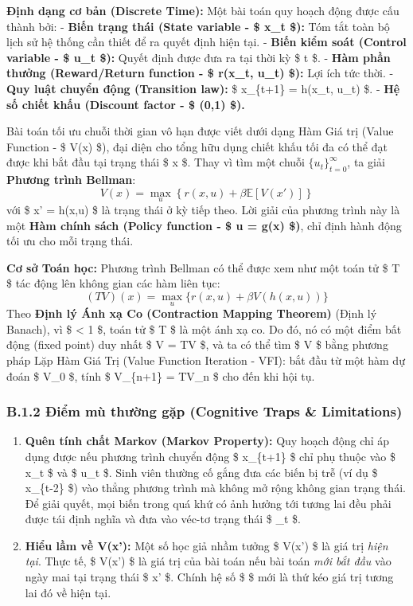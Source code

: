 \documentclass[
]{article}
\providecommand{\tightlist}{%
  \setlength{\itemsep}{0pt}\setlength{\parskip}{0pt}}
\begin{document}
\textbf{Định dạng cơ bản (Discrete Time):} Một bài toán quy hoạch động
được cấu thành bởi: - \textbf{Biến trạng thái (State variable - \$ x\_t
\$):} Tóm tắt toàn bộ lịch sử hệ thống cần thiết để ra quyết định hiện
tại. - \textbf{Biến kiểm soát (Control variable - \$ u\_t \$):} Quyết
định được đưa ra tại thời kỳ \$ t \$. - \textbf{Hàm phần thưởng
(Reward/Return function - \$ r(x\_t, u\_t) \$):} Lợi ích tức thời. -
\textbf{Quy luật chuyển động (Transition law):} \$ x\_\{t+1\} = h(x\_t,
u\_t) \$. - \textbf{Hệ số chiết khấu (Discount factor - \$
\beta \in (0,1) \$).}

Bài toán tối ưu chuỗi thời gian vô hạn được viết dưới dạng Hàm Giá trị
(Value Function - \$ V(x) \$), đại diện cho tổng hữu dụng chiết khấu tối
đa có thể đạt được khi bắt đầu tại trạng thái \$ x \$. Thay vì tìm một
chuỗi \(\{u_t\}_{t=0}^\infty\), ta giải \textbf{Phương trình Bellman}:
\[ V(x) = \max_{u} \left\{ r(x,u) + \beta \mathbb{E}[V(x')] \right\} \]
với \$ x' = h(x,u) \$ là trạng thái ở kỳ tiếp theo. Lời giải của phương
trình này là một \textbf{Hàm chính sách (Policy function - \$ u = g(x)
\$)}, chỉ định hành động tối ưu cho mỗi trạng thái.

\textbf{Cơ sở Toán học:} Phương trình Bellman có thể được xem như một
toán tử \$ T \$ tác động lên không gian các hàm liên tục:
\[ (TV)(x) = \max_u \{ r(x,u) + \beta V(h(x,u)) \} \] Theo \textbf{Định
lý Ánh xạ Co (Contraction Mapping Theorem)} (Định lý Banach), vì \$
\beta \textless{} 1 \$, toán tử \$ T \$ là một ánh xạ co. Do đó, nó có
một điểm bất động (fixed point) duy nhất \$ V = TV \$, và ta có thể tìm
\$ V \$ bằng phương pháp Lặp Hàm Giá Trị (Value Function Iteration -
VFI): bắt đầu từ một hàm dự đoán \$ V\_0 \$, tính \$ V\_\{n+1\} = TV\_n
\$ cho đến khi hội tụ.

\subsubsection{B.1.2 Điểm mù thường gặp (Cognitive Traps \&
Limitations)}\label{b.1.2-ux111iux1ec3m-muxf9-thux1b0ux1eddng-gux1eb7p-cognitive-traps-limitations}

\begin{enumerate}
\def\labelenumi{\arabic{enumi}.}
\tightlist
\item
  \textbf{Quên tính chất Markov (Markov Property):} Quy hoạch động chỉ
  áp dụng được nếu phương trình chuyển động \$ x\_\{t+1\} \$ chỉ phụ
  thuộc vào \$ x\_t \$ và \$ u\_t \$. Sinh viên thường cố gắng đưa các
  biến bị trễ (ví dụ \$ x\_\{t-2\} \$) vào thẳng phương trình mà không
  mở rộng không gian trạng thái. Để giải quyết, mọi biến trong quá khứ
  có ảnh hưởng tới tương lai đều phải được tái định nghĩa và đưa vào
  véc-tơ trạng thái \$ \_t \$.
\item
  \textbf{Hiểu lầm về V(x'):} Một số học giả nhầm tưởng \$ V(x') \$ là
  giá trị \emph{hiện tại}. Thực tế, \$ V(x') \$ là giá trị của bài toán
  nếu bài toán \emph{mới bắt đầu} vào ngày mai tại trạng thái \$ x' \$.
  Chính hệ số \$ \beta \$ mới là thứ kéo giá trị tương lai đó về hiện
  tại.
\end{enumerate}
\end{document}
